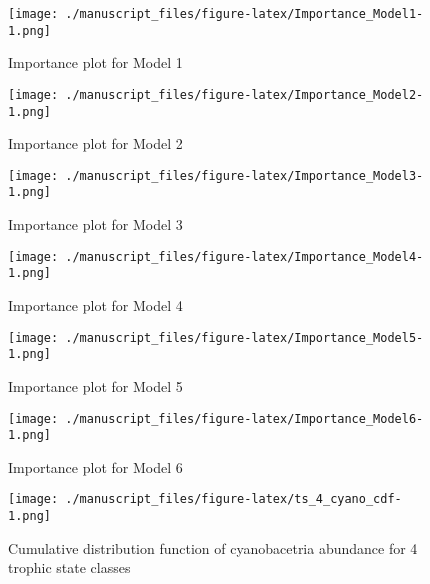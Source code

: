 \documentclass[11pt,]{article}
\begin{document}
\newpage

\begin{figure}[htbp]
\centering
\texttt{[image: ./manuscript\_files/figure-latex/Importance\_Model1-1.png]}
\caption{Importance plot for Model 1\label{fig:Importance_Model1}}
\end{figure}

\newpage

\begin{figure}[htbp]
\centering
\texttt{[image: ./manuscript\_files/figure-latex/Importance\_Model2-1.png]}
\caption{Importance plot for Model 2\label{fig:Importance_Model2}}
\end{figure}

\newpage

\begin{figure}[htbp]
\centering
\texttt{[image: ./manuscript\_files/figure-latex/Importance\_Model3-1.png]}
\caption{Importance plot for Model 3\label{fig:Importance_Model3}}
\end{figure}

\newpage

\begin{figure}[htbp]
\centering
\texttt{[image: ./manuscript\_files/figure-latex/Importance\_Model4-1.png]}
\caption{Importance plot for Model 4\label{fig:Importance_Model4}}
\end{figure}

\newpage

\begin{figure}[htbp]
\centering
\texttt{[image: ./manuscript\_files/figure-latex/Importance\_Model5-1.png]}
\caption{Importance plot for Model 5\label{fig:Importance_Model5}}
\end{figure}

\newpage

\begin{figure}[htbp]
\centering
\texttt{[image: ./manuscript\_files/figure-latex/Importance\_Model6-1.png]}
\caption{Importance plot for Model 6\label{fig:Importance_Model6}}
\end{figure}

\newpage

\begin{figure}[htbp]
\centering
\texttt{[image: ./manuscript\_files/figure-latex/ts\_4\_cyano\_cdf-1.png]}
\caption{Cumulative distribution function of cyanobacetria abundance for
4 trophic state classes\label{fig:ts_4_cyano_cdf}}
\end{figure}

\newpage
\end{document}
